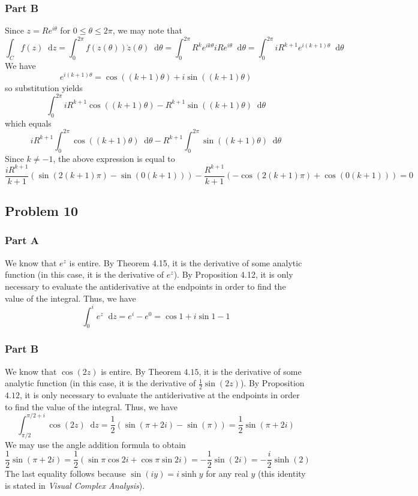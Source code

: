 \documentclass[12pt]{article}
\newcommand*\diff{\mathop{}\!\mathrm{d}}
\begin{document}
\subsubsection*{Part B}
Since $z = Re^{i\theta}$ for $0 \leq \theta \leq 2\pi$, we may note that
\[
\int_C f(z) \diff z = \int_{0}^{2\pi} f(z(\theta)) \dot{z}(\theta) \diff \theta = \int_{0}^{2\pi} R^ke^{ik\theta} iRe^{i\theta} \diff \theta = \int_{0}^{2\pi} iR^{k+1}e^{i(k+1)\theta} \diff \theta
\] We have
\[
e^{i(k+1)\theta} = \cos((k+1)\theta)+i\sin((k+1)\theta)
\] so substitution yields
\[
\int_{0}^{2\pi} i R^{k+1} \cos((k+1)\theta) - R^{k+1}\sin((k+1)\theta) \diff \theta 
\] which equals
\[
i R^{k+1} \int_0^{2\pi} \cos((k+1)\theta) \diff \theta - R^{k+1} \int_{0}^{2\pi}\sin((k+1)\theta) \diff \theta 
\] Since $k \neq -1$, the above expression is equal to 
\[
\frac{i R^{k+1}}{k+1} (\sin(2(k+1)\pi)-\sin(0(k+1))) - \frac{R^{k+1}}{k+1} (-\cos(2(k+1)\pi) + \cos(0(k+1))) = 0
\]
\newpage
\subsection*{Problem 10}
\subsubsection*{Part A}
We know that $e^z$ is entire. By Theorem 4.15, it is the derivative of some analytic function (in this case, it is the derivative of $e^z$). By Proposition 4.12, it is only necessary to evaluate the antiderivative at the endpoints in order to find the value of the integral. Thus, we have
\[
\int_0^i e^z \diff z = e^{i} - e^{0} = \cos 1 + i \sin 1 - 1
\]
\subsubsection*{Part B}
We know that $\cos(2z)$ is entire. By Theorem $4.15$, it is the derivative of some analytic function (in this case, it is the derivative of $\frac{1}{2}\sin(2z)$). By Proposition $4.12$, it is only necessary to evaluate the antiderivative at the endpoints in order to find the value of the integral. Thus, we have
\[
\int_{\pi/2}^{\pi/2+i} \cos(2z) \diff z = \frac{1}{2} (\sin(\pi+2i) - \sin(\pi)) = \frac{1}{2}\sin(\pi+2i) 
\] We may use the angle addition formula to obtain
\[
\frac{1}{2}\sin(\pi+2i) = \frac{1}{2}(\sin \pi \cos 2i + \cos \pi \sin 2i) = -\frac{1}{2}\sin(2i) = -\frac{i}{2}\sinh(2)
\] The last equality follows because $\sin (iy) = i \sinh y$ for any real $y$ (this identity is stated in \emph{Visual Complex Analysis}).
\newpage
\end{document}
